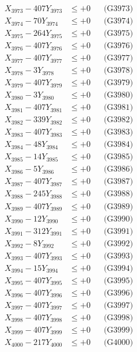 \documentclass[a4paper,10pt]{article}
\begin{document}
{\begin{align}
X_{3973} - 407Y_{3973} &\leq +0 && \text{(G3973)} \\
X_{3974} - 70Y_{3974} &\leq +0 && \text{(G3974)} \\
X_{3975} - 264Y_{3975} &\leq +0 && \text{(G3975)} \\
X_{3976} - 407Y_{3976} &\leq +0 && \text{(G3976)} \\
X_{3977} - 407Y_{3977} &\leq +0 && \text{(G3977)} \\
X_{3978} - 3Y_{3978} &\leq +0 && \text{(G3978)} \\
X_{3979} - 407Y_{3979} &\leq +0 && \text{(G3979)} \\
X_{3980} - 3Y_{3980} &\leq +0 && \text{(G3980)} \\
\allowbreak
X_{3981} - 407Y_{3981} &\leq +0 && \text{(G3981)} \\
X_{3982} - 339Y_{3982} &\leq +0 && \text{(G3982)} \\
X_{3983} - 407Y_{3983} &\leq +0 && \text{(G3983)} \\
X_{3984} - 48Y_{3984} &\leq +0 && \text{(G3984)} \\
X_{3985} - 14Y_{3985} &\leq +0 && \text{(G3985)} \\
X_{3986} - 5Y_{3986} &\leq +0 && \text{(G3986)} \\
X_{3987} - 407Y_{3987} &\leq +0 && \text{(G3987)} \\
X_{3988} - 245Y_{3988} &\leq +0 && \text{(G3988)} \\
X_{3989} - 407Y_{3989} &\leq +0 && \text{(G3989)} \\
X_{3990} - 12Y_{3990} &\leq +0 && \text{(G3990)} \\
\allowbreak
X_{3991} - 312Y_{3991} &\leq +0 && \text{(G3991)} \\
X_{3992} - 8Y_{3992} &\leq +0 && \text{(G3992)} \\
X_{3993} - 407Y_{3993} &\leq +0 && \text{(G3993)} \\
X_{3994} - 15Y_{3994} &\leq +0 && \text{(G3994)} \\
X_{3995} - 407Y_{3995} &\leq +0 && \text{(G3995)} \\
X_{3996} - 407Y_{3996} &\leq +0 && \text{(G3996)} \\
X_{3997} - 407Y_{3997} &\leq +0 && \text{(G3997)} \\
X_{3998} - 407Y_{3998} &\leq +0 && \text{(G3998)} \\
X_{3999} - 407Y_{3999} &\leq +0 && \text{(G3999)} \\
X_{4000} - 217Y_{4000} &\leq +0 && \text{(G4000)} \\

\end{align}}
\end{document}
